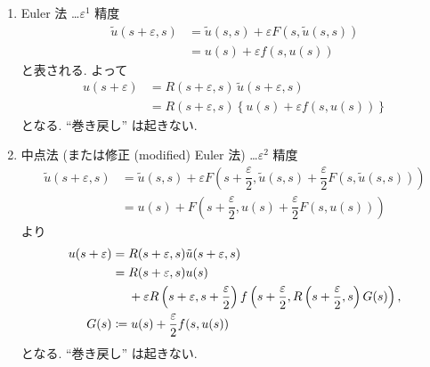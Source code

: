 \documentclass[12pt, a4j]{jsarticle}
\newcommand{\e}{\varepsilon}
\begin{document}
\begin{enumerate}[label=(\arabic{*})]
 \item Euler 法 \dots $\e^{1}$ 精度
       \begin{align}
	\tilde{u}(s + \e, s)
	&= \tilde{u}(s, s) + \e F(s, \tilde{u}(s, s))
	\\
	&= u(s) + \e f(s, u(s))
       \end{align}
       と表される. よって
       \begin{align}
	u(s + \e) 
	 &= R(s + \e, s) \, \tilde{u}(s + \e, s)
	 \\
	 &= R(s + \e, s) 
	\left\{ u(s) + \e f(s, u(s)) \right\}	
       \end{align}
       となる. ``巻き戻し'' は起きない.
 \item 中点法 (または修正 (modified) Euler 法) \dots $\e^{2}$ 精度
       \begin{align}
	\tilde{u}(s + \e, s)
	&= \tilde{u}(s, s)
	   + \e F\left( 
	           s + \dfrac{\e}{2},
	           \tilde{u}(s, s) 
	             + \dfrac{\e}{2} F(s, \tilde{u}(s, s))
	         \right)
	\\
	&= u(s)
	   + F\left(
	        s + \dfrac{\e}{2},
	        u(s) + \dfrac{\e}{2} F(s, u(s))
	      \right)
       \end{align}
       より
       \begin{align}
	u(s + \e)
	&= R(s + \e, s) \tilde{u}(s + \e, s)
	\\
	&= R(s + \e, s) u(s) \\
	&\hphantom{{}={}}
	+ \e R\left( s + \e, s + \dfrac{\e}{2} \right)
	  f\left(
	     s + \dfrac{\e}{2},
	     R\left( s + \dfrac{\e}{2}, s \right)
	     G(s)
	   \right),
	\\
	G(s)
	&\coloneqq u(s) + \dfrac{\e}{2} f(s, u(s))
       \end{align}
       となる. ``巻き戻し'' は起きない.


\end{enumerate}
\end{document}
